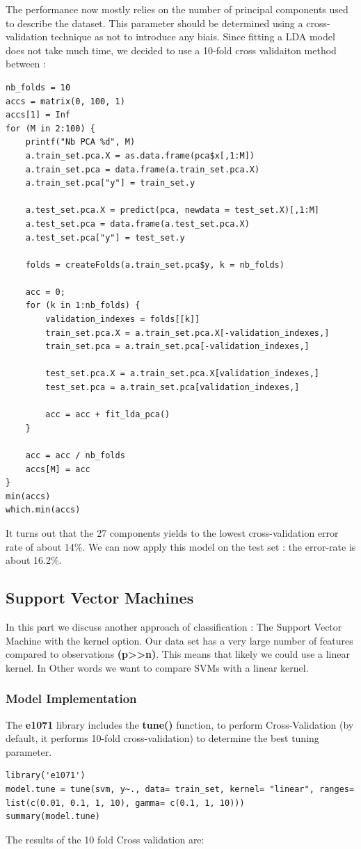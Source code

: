 \documentclass[]{report}
\begin{document}
The performance now mostly relies on the number of principal components used to describe the dataset. This parameter should be determined using a cross-validation technique as not to introduce any biais. Since fitting a LDA model does not take much time, we decided to use a 10-fold cross validaiton method between : 

\begin{lstlisting}
nb_folds = 10
accs = matrix(0, 100, 1)
accs[1] = Inf
for (M in 2:100) {
	printf("Nb PCA %d", M)
	a.train_set.pca.X = as.data.frame(pca$x[,1:M])
	a.train_set.pca = data.frame(a.train_set.pca.X)
	a.train_set.pca["y"] = train_set.y
	
	a.test_set.pca.X = predict(pca, newdata = test_set.X)[,1:M]
	a.test_set.pca = data.frame(a.test_set.pca.X)
	a.test_set.pca["y"] = test_set.y
	
	folds = createFolds(a.train_set.pca$y, k = nb_folds)
	
	acc = 0;
	for (k in 1:nb_folds) {
		validation_indexes = folds[[k]]
		train_set.pca.X = a.train_set.pca.X[-validation_indexes,]
		train_set.pca = a.train_set.pca[-validation_indexes,]
		
		test_set.pca.X = a.train_set.pca.X[validation_indexes,]
		test_set.pca = a.train_set.pca[validation_indexes,]
		
		acc = acc + fit_lda_pca()
	}
	
	acc = acc / nb_folds
	accs[M] = acc
}
min(accs)
which.min(accs)
\end{lstlisting}

It turns out that the 27 components yields to the lowest cross-validation error rate of about 14\%. We can now apply this model on the test set : the error-rate is about 16.2\%.



\pagebreak
\pagebreak
\subsection{Support Vector Machines}
In this part we discuss another approach of classification : The Support Vector Machine with the kernel option. Our data set has a very large number of features compared to observations \textbf{(p>>n)}. This means that likely we could use a linear kernel. In Other words we want to compare SVMs with a linear kernel.

\subsubsection{Model Implementation}
The \textbf{e1071} library includes the \textbf{tune()} function, to perform Cross-Validation (by default, it performs 10-fold cross-validation) to determine the best tuning parameter.
\begin{lstlisting}
library('e1071')
model.tune = tune(svm, y~., data= train_set, kernel= "linear", ranges= list(c(0.01, 0.1, 1, 10), gamma= c(0.1, 1, 10)))
summary(model.tune)
\end{lstlisting}
The results of the 10 fold Cross validation are:
\end{document}
